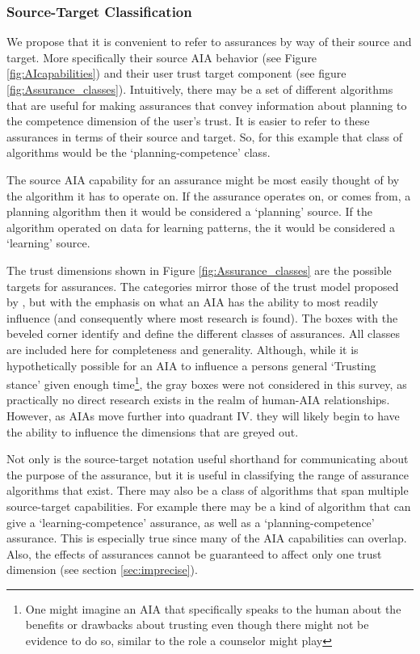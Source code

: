 \subsubsection{Source-Target Classification}

    We propose that it is convenient to refer to assurances by way of their source and target. More specifically their source AIA behavior (see Figure \ref{fig:AIcapabilities}) and their user trust target component (see figure \ref{fig:Assurance_classes}). Intuitively, there may be a set of different algorithms that are useful for making assurances that convey information about planning to the competence dimension of the user's trust. It is easier to refer to these assurances in terms of their source and target. So, for this example that class of algorithms would be the `planning-competence' class.

    The source AIA capability for an assurance might be most easily thought of by the algorithm it has to operate on. If the assurance operates on, or comes from, a planning algorithm then it would be considered a `planning' source. If the algorithm operated on data for learning patterns, the it would be considered a `learning' source.

    The trust dimensions shown in Figure \ref{fig:Assurance_classes} are the possible targets for assurances. The categories mirror those of the trust model proposed by \citet{McKnight2001-fa}, but with the emphasis on what an AIA has the ability to most readily influence (and consequently where most research is found). The boxes with the beveled corner identify and define the different classes of assurances. All classes are included here for completeness and generality. Although, while it is hypothetically possible for an AIA to influence a persons general `Trusting stance' given enough time\footnote{One might imagine an AIA that specifically speaks to the human about the benefits or drawbacks about trusting even though there might not be evidence to do so, similar to the role a counselor might play}, the gray boxes were not considered in this survey, as practically no direct research exists in the realm of human-AIA relationships. However, as AIAs move further into quadrant IV. they will likely begin to have the ability to influence the dimensions that are greyed out.
    
    Not only is the source-target notation useful shorthand for communicating about the purpose of the assurance, but it is useful in classifying the range of assurance algorithms that exist. There may also be a class of algorithms that span multiple source-target capabilities. For example there may be a kind of algorithm that can give a `learning-competence' assurance, as well as a `planning-competence' assurance. This is especially true since many of the AIA capabilities can overlap. Also, the effects of assurances cannot be guaranteed to affect only one trust dimension (see section \ref{sec:imprecise}).
